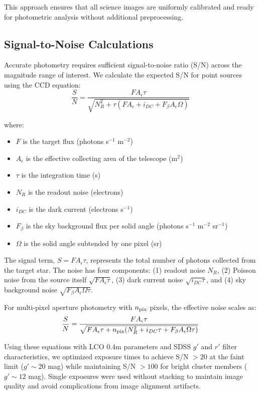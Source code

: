 \documentclass[linenumbers,trackchanges,twocolumn]{aastex701}
\begin{document}
This approach ensures that all science images are uniformly calibrated and ready for photometric analysis without additional preprocessing.

\subsection{Signal-to-Noise Calculations}

Accurate photometry requires sufficient signal-to-noise ratio (S/N) across the magnitude range of interest. We calculate the expected S/N for point sources using the CCD equation:
\begin{equation}
\frac{S}{N} = \frac{F A_\epsilon \tau}{\sqrt{N_R^2 + \tau (F A_\epsilon + i_{DC} + F_\beta A_\epsilon \Omega)}}
\label{eq:snr}
\end{equation}

where:
\begin{itemize}
    \item $F$ is the target flux (photons s$^{-1}$ m$^{-2}$)
    \item $A_\epsilon$ is the effective collecting area of the telescope (m$^{2}$)
    \item $\tau$ is the integration time (s)
    \item $N_R$ is the readout noise (electrons)
    \item $i_{DC}$ is the dark current (electrons s$^{-1}$)
    \item $F_\beta$ is the sky background flux per solid angle (photons s$^{-1}$ m$^{-2}$ sr$^{-1}$)
    \item $\Omega$ is the solid angle subtended by one pixel (sr)
\end{itemize}

The signal term, $S = F A_\epsilon \tau$, represents the total number of photons collected from the target star. The noise has four components: (1) readout noise $N_R$, (2) Poisson noise from the source itself $\sqrt{F A_\epsilon \tau}$, (3) dark current noise $\sqrt{i_{DC} \tau}$, and (4) sky background noise $\sqrt{F_\beta A_\epsilon \Omega \tau}$.

For multi-pixel aperture photometry with $n_{\rm pix}$ pixels, the effective noise scales as:
\begin{equation}
\frac{S}{N} = \frac{F A_\epsilon \tau}{\sqrt{F A_\epsilon \tau + n_{\rm pix}(N_R^2 + i_{DC}\tau + F_\beta A_\epsilon \Omega \tau)}}
\label{eq:snr_aperture}
\end{equation}

Using these equations with LCO 0.4m parameters and SDSS $g'$ and $r'$ filter characteristics, we optimized exposure times to achieve S/N $> 20$ at the faint limit ($g' \sim 20$ mag) while maintaining S/N $> 100$ for bright cluster members ($g' \sim 12$ mag). Single exposures were used without stacking to maintain image quality and avoid complications from image alignment artifacts.
\end{document}
